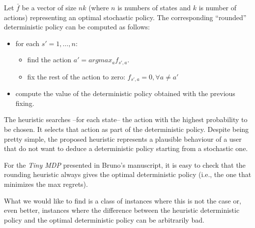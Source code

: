 \documentclass[10pt,a4paper]{article}
\begin{document}
Let $\bar{f}$ be a vector of size  $nk$ (where $n$ is numbers of states and $k$ is number of actions) representing an optimal stochastic policy. The corresponding ``rounded'' deterministic policy can be computed as follows:
\begin{itemize}
\item for each $s'=1,\dots,n$:
\begin{itemize}
\item find the action $a' = argmax_{a}f_{s',a}$.
\item fix the rest of the action to zero: $f_{s',a} =0, \forall a \neq a'$
\end{itemize}
\item compute the value of the deterministic policy obtained with the previous fixing.
\end{itemize}
 
The heuristic searches --for each state-- the action with the highest probability to be chosen. It selects that action as part of the deterministic policy.
Despite being pretty simple, the proposed heuristic represents a plausible behaviour of a user that do not want to deduce a deterministic policy starting from a stochastic one.  

For the \textit{Tiny MDP} presented in Bruno's manuscript, it is easy to check that the rounding heuristic always gives the optimal deterministic policy (i.e., the one that minimizes the max regrets).

What we would like to find is a class of instances where this is not the case or, even better, instances where the difference between the heuristic deterministic policy and the optimal deterministic policy can be arbitrarily bad. 	
\end{document}
